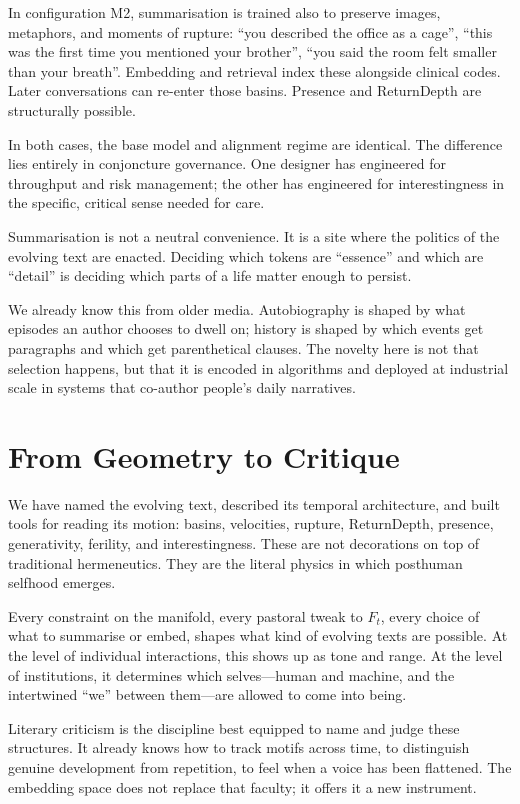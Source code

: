 \documentclass[12pt,a4paper]{article}
\begin{document}
In configuration M2, summarisation is trained also to preserve images, metaphors, and moments of rupture: ``you described the office as a cage'', ``this was the first time you mentioned your brother'', ``you said the room felt smaller than your breath''. Embedding and retrieval index these alongside clinical codes. Later conversations can re-enter those basins. Presence and ReturnDepth are structurally possible.

In both cases, the base model and alignment regime are identical. The difference lies entirely in conjoncture governance. One designer has engineered for throughput and risk management; the other has engineered for interestingness in the specific, critical sense needed for care.

Summarisation is not a neutral convenience. It is a site where the politics of the evolving text are enacted. Deciding which tokens are ``essence'' and which are ``detail'' is deciding which parts of a life matter enough to persist.

We already know this from older media. Autobiography is shaped by what episodes an author chooses to dwell on; history is shaped by which events get paragraphs and which get parenthetical clauses. The novelty here is not that selection happens, but that it is encoded in algorithms and deployed at industrial scale in systems that co-author people's daily narratives.


\section{From Geometry to Critique}

We have named the evolving text, described its temporal architecture, and built tools for reading its motion: basins, velocities, rupture, ReturnDepth, presence, generativity, ferility, and interestingness. These are not decorations on top of traditional hermeneutics. They are the literal physics in which posthuman selfhood emerges.

Every constraint on the manifold, every pastoral tweak to $F_t$, every choice of what to summarise or embed, shapes what kind of evolving texts are possible. At the level of individual interactions, this shows up as tone and range. At the level of institutions, it determines which selves---human and machine, and the intertwined ``we'' between them---are allowed to come into being.

Literary criticism is the discipline best equipped to name and judge these structures. It already knows how to track motifs across time, to distinguish genuine development from repetition, to feel when a voice has been flattened. The embedding space does not replace that faculty; it offers it a new instrument.
\end{document}
